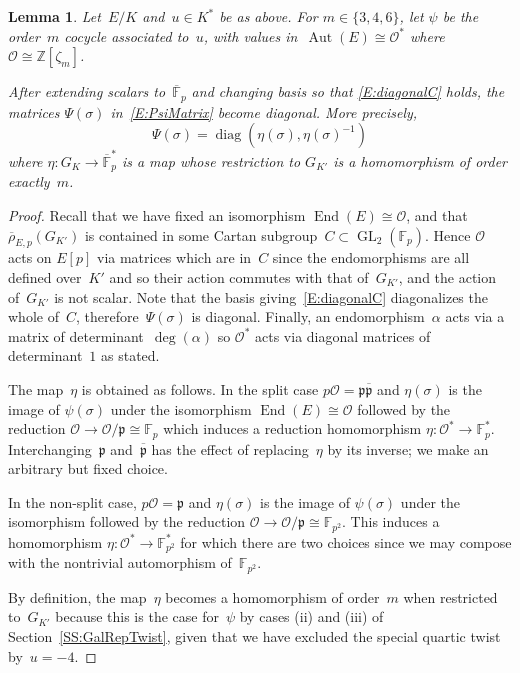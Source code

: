 \documentclass[twoside,leqno,symbols-for-thanks, draft]{rmi}
\numberwithin{equation}{section}
\newcommand{\F}{\mathbb{F}}
\newcommand{\Fp}{\mathbb{F}_p}
\newcommand{\Fpstar}{\mathbb{F}_p^*}
\newcommand{\Fbar}{{\overline{\F}}}
\newcommand{\Z}{\mathbb{Z}}
\newcommand{\rhobar}{{\overline{\rho}}}
\newcommand{\frp}{{\mathfrak p}}
\newcommand{\calO}{\mathcal{O}}
\DeclareMathOperator{\Aut}{Aut}
\DeclareMathOperator{\End}{End}
\newcommand{\GL}{\operatorname{GL}}
\newcommand{\diag}{{\operatorname{diag}}}
\newtheorem{lemma}[theorem]{Lemma}
\theoremstyle{remark}
\begin{document}
\begin{lemma}\label{L:DiagonalPsi}
Let~$E/K$ and~$u\in K^*$ be as above.  For $m\in\{3,4,6\}$, let $\psi$
be the order~$m$ cocycle associated to~$u$, with values
in~$\Aut(E)\cong\calO^*$ where $\calO\cong\Z[\zeta_m]$.

After extending scalars to~$\Fbar_p$ and changing basis so that
\eqref{E:diagonalC} holds, the matrices $\Psi(\sigma)$
in~\eqref{E:PsiMatrix} become diagonal.  More precisely,
\[
\Psi(\sigma) = \diag(\eta(\sigma),\eta(\sigma)^{-1})
\]
where $\eta:G_K\to \overline{\F}_p^*$ is a map whose restriction to
$G_{K'}$ is a homomorphism of order exactly~$m$.
\end{lemma}
\begin{proof}
Recall that we have fixed an isomorphism $\End(E)\cong\calO$, and that
$\rhobar_{E,p}(G_{K'})$ is contained in some Cartan subgroup~$C
\subset \GL_2(\Fp)$.  Hence $\calO$ acts on $E[p]$ via matrices which
are in~$C$ since the endomorphisms are all defined over~$K'$ and so
their action commutes with that of~$G_{K'}$, and the action
of~$G_{K'}$ is not scalar. Note that the basis
giving~\eqref{E:diagonalC} diagonalizes the whole of~$C$,
therefore~$\Psi(\sigma)$ is diagonal. Finally, an
endomorphism~$\alpha$ acts via a matrix of determinant~$\deg(\alpha)$
so $\calO^*$ acts via diagonal matrices of determinant~$1$ as stated.

The map~$\eta$ is obtained as follows.  In the split case
$p\calO=\frp\overline{\frp}$ and $\eta(\sigma)$ is the image of
$\psi(\sigma)$ under the isomorphism
$\End(E)\cong\calO$ followed by the reduction
$\calO\to\calO/\frp\cong\Fp$ which induces a reduction homomorphism
$\eta:\calO^*\to\Fpstar$.  Interchanging~$\frp$ and~$\overline{\frp}$
has the effect of replacing~$\eta$ by its inverse; we make an
arbitrary but fixed choice.

In the non-split case, $p\calO=\frp$ and 
$\eta(\sigma)$ is the image
of $\psi(\sigma)$ under the isomorphism followed by the reduction
$\calO\to\calO/\frp\cong\F_{p^2}$. 
This induces a 
homomorphism $\eta: \calO^*\to\F_{p^2}^*$ for which there are two
choices since we may compose with the nontrivial
automorphism of~$\F_{p^2}$.

By definition, the map~$\eta$ becomes a homomorphism of order~$m$ when restricted to~$G_{K'}$ because this is the case for~$\psi$ by cases (ii) and (iii) 
of Section~\ref{SS:GalRepTwist}, given that we have excluded the special quartic twist by~$u=-4$.
\end{proof}
\end{document}

